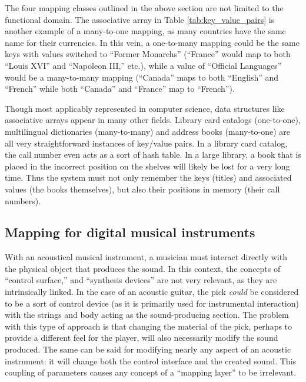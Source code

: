 The four mapping classes outlined in the above section are not limited to the functional domain. The associative array in Table \ref{tab:key_value_pairs} is another example of a many-to-one mapping, as many countries have the same name for their currencies. In this vein, a one-to-many mapping could be the same keys with values switched to ``Former Monarchs'' (``France'' would map to both ``Louis XVI'' and ``Napoleon III,'' etc.), while a value of ``Official Languages'' would be a many-to-many mapping (``Canada'' maps to both ``English'' and ``French'' while both ``Canada'' and ``France'' map to ``French'').

Though most applicably represented in computer science, data structures like associative arrays appear in many other fields. Library card catalogs (one-to-one), multilingual dictionaries (many-to-many) and address books (many-to-one) are all very straightforward instances of key/value pairs. In a library card catalog, the call number even acts as a sort of hash table. In a large library, a book that is placed in the incorrect position on the shelves will likely be lost for a very long time. Thus the system must not only remember the keys (titles) and associated values (the books themselves), but also their positions in memory (their call numbers).


\subsection{Mapping for digital musical instruments} \label{sec:mappingforDMIs}

With an acoustical musical instrument, a musician must interact directly with the physical object that produces the sound. In this context, the concepts of ``control surface,'' and ``synthesis devices'' are not very relevant, as they are intrinsically linked. In the case of an acoustic guitar, the pick \emph{could} be considered to be a sort of control device (as it is primarily used for instrumental interaction) with the strings and body acting as the sound-producing section. The problem with this type of approach is that changing the material of the pick, perhaps to provide a different feel for the player, will also necessarily modify the sound produced. The same can be said for modifying nearly any aspect of an acoustic instrument: it will change both the control interface and the created sound. This coupling of parameters causes any concept of a ``mapping layer'' to be irrelevant.

